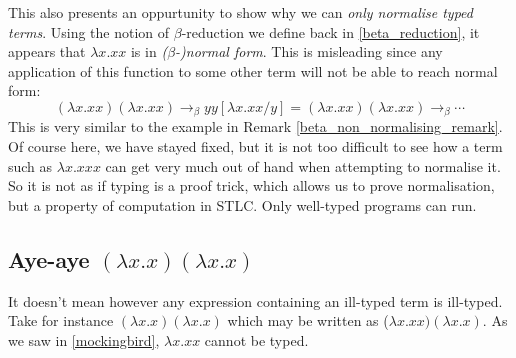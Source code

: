 \begin{remark}
    This also presents an oppurtunity to show why we can \emph{only normalise typed terms}. Using the notion of $\beta$-reduction we define back in \ref{beta_reduction}, it appears that $\lambda x . x x$ is in \emph{($\beta$-)normal form}. This is misleading since any application of this function to some other term will not be able to reach normal form:
    \begin{equation*}
        (\lambda x. x x)(\lambda x . x x) \to_{\beta} y y [\lambda x . x x / y] = (\lambda x . x x)(\lambda x . x x) \to_{\beta} \cdots
    \end{equation*}
    This is very similar to the example in Remark \ref{beta_non_normalising_remark}. Of course here, we have stayed fixed, but it is not too difficult to see how a term such as $\lambda x . x x x$ can get very much out of hand when attempting to normalise it.
    So it is not as if typing is a proof trick, which allows us to prove normalisation, but a property of computation in STLC. Only well-typed programs can run.
\end{remark}

\subsection{Aye-aye \texorpdfstring{$(\lambda x . x)(\lambda x . x)$}{}} %

It doesn't mean however any expression containing an ill-typed term is ill-typed. Take for instance $(\lambda x . x)( \lambda x . x)$ which may be written as ($\lambda x . x x) (\lambda x . x)$. As we saw in \ref{mockingbird}, $\lambda x . x x$ cannot be typed.


